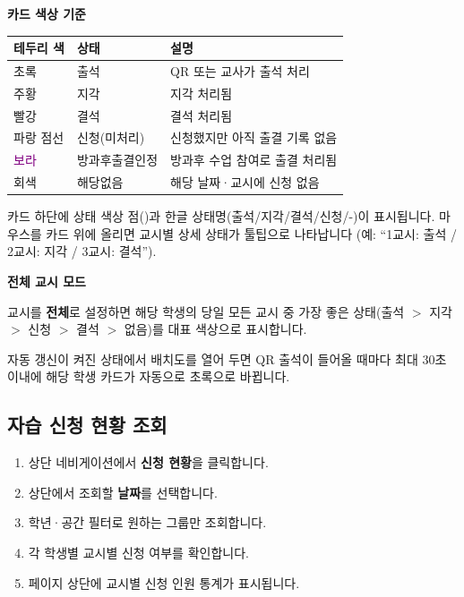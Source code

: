 \documentclass[a4paper,12pt]{article}
\newcommand{\menu}[1]{\textcolor{primary}{\textbf{#1}}}
\begin{document}
\textbf{카드 색상 기준}

\begin{center}
\begin{tabular}{lll}
\toprule
\textbf{테두리 색} & \textbf{상태} & \textbf{설명} \\
\midrule
\textcolor{success}{초록} & 출석 & QR 또는 교사가 출석 처리 \\
\textcolor{warning!70!black}{주황} & 지각 & 지각 처리됨 \\
\textcolor{danger}{빨강} & 결석 & 결석 처리됨 \\
\textcolor{primary}{파랑 점선} & 신청(미처리) & 신청했지만 아직 출결 기록 없음 \\
\textcolor{purple}{보라} & 방과후출결인정 & 방과후 수업 참여로 출결 처리됨 \\
회색 & 해당없음 & 해당 날짜·교시에 신청 없음 \\
\bottomrule
\end{tabular}
\end{center}

카드 하단에 상태 색상 점(\textbullet)과 한글 상태명(출석/지각/결석/신청/-)이 표시됩니다.
마우스를 카드 위에 올리면 교시별 상세 상태가 툴팁으로 나타납니다
(예: ``1교시: 출석 / 2교시: 지각 / 3교시: 결석'').

\textbf{전체 교시 모드}

교시를 \menu{전체}로 설정하면 해당 학생의 당일 모든 교시 중
가장 좋은 상태(출석 $>$ 지각 $>$ 신청 $>$ 결석 $>$ 없음)를 대표 색상으로 표시합니다.

\begin{tipbox}
  자동 갱신이 켜진 상태에서 배치도를 열어 두면 QR 출석이 들어올 때마다
  최대 30초 이내에 해당 학생 카드가 자동으로 \textcolor{success}{초록}으로 바뀝니다.
\end{tipbox}

\subsection{자습 신청 현황 조회}

\begin{enumerate}[leftmargin=1.5em]
    \item 상단 네비게이션에서 \menu{신청 현황}을 클릭합니다.
    \item 상단에서 조회할 \textbf{날짜}를 선택합니다.
    \item 학년·공간 필터로 원하는 그룹만 조회합니다.
    \item 각 학생별 교시별 신청 여부를 확인합니다.
    \item 페이지 상단에 교시별 신청 인원 통계가 표시됩니다.
\end{enumerate}
\end{document}
